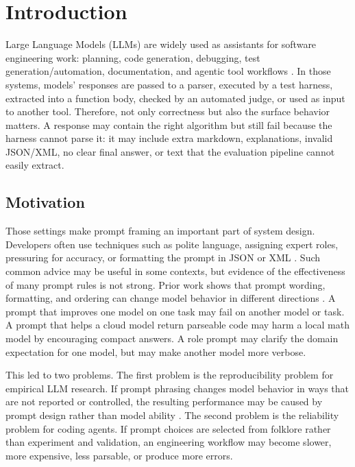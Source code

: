 \chapter{Introduction\label{cha:chapter1}}

Large Language Models (LLMs) are widely used as assistants for software engineering work: planning, code generation, debugging, test generation/automation, documentation, and agentic tool workflows \cite{brown2020fewshot, ouyang2022instructgpt, chen2021codex, jimenez2023swebench, yao2023react}. In those systems, models' responses are passed to a parser, executed by a test harness, extracted into a function body, checked by an automated judge, or used as input to another tool. Therefore, not only correctness but also the surface behavior matters. A response may contain the right algorithm but still fail because the harness cannot parse it: it may include extra markdown, explanations, invalid JSON/XML, no clear final answer, or text that the evaluation pipeline cannot easily extract.

\section{Motivation}

Those settings make prompt framing an important part of system design. Developers often use techniques such as polite language, assigning expert roles, pressuring for accuracy, or formatting the prompt in JSON or XML \cite{li2023emotionprompt, yin2024politeness, liu2024structuredoutput}. Such common advice may be useful in some contexts, but evidence of the effectiveness of many prompt rules is not strong. Prior work shows that prompt wording, formatting, and ordering can change model behavior in different directions \cite{zhao2021calibrate, lu2021fantastically, sclar2023spurious, zhuo2024prosa}. A prompt that improves one model on one task may fail on another model or task. A prompt that helps a cloud model return parseable code may harm a local math model by encouraging compact answers. A role prompt may clarify the domain expectation for one model, but may make another model more verbose.

This led to two problems. The first problem is the reproducibility problem for empirical LLM research. If prompt phrasing changes model behavior in ways that are not reported or controlled, the resulting performance may be caused by prompt design rather than model ability \cite{hua2025promptartifact}. The second problem is the reliability problem for coding agents. If prompt choices are selected from folklore rather than experiment and validation, an engineering workflow may become slower, more expensive, less parsable, or produce more errors.


